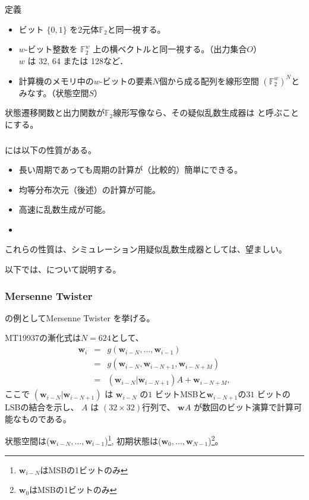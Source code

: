 \documentclass[cjk, dvips, xcolor=dvipsnames, hyperref={bookmarks=false}]{beamer}
\def\F2{{\mathbb F}_2}
\def\bw{{{\mathbf w}}}
\begin{document}
\begin{frame}[t]
  \frametitle{\insertsubsection}
  \begin{block}{定義}
    \begin{itemize}
    \item ビット $\{0,1\}$ を2元体$\F2$と同一視する。
    \item $w$-ビット整数を $\F2^{w}$ 上の横ベクトルと同一視する。（出力集合$O$）\\
      $w$ は 32, 64 または 128など．
    \item 計算機のメモリ中の$w$-ビットの要素$N$個から成る配列を線形空間
      $(\F2^{w})^N$とみなす。（状態空間$S$）
    \end{itemize}
  \end{block}

  \pause
  \vspace{\baselineskip}
  状態遷移関数と出力関数が$\F2$線形写像なら、その疑似乱数生成器は
  \strong{\FLPRNG}と呼ぶことにする。
\end{frame}

\begin{frame}[t]
  \frametitle{\insertsubsection}

  \FLPRNG には以下の性質がある。
  \begin{itemize}
  \item 長い周期であっても周期の計算が（比較的）簡単にできる。
  \pause
  \item 均等分布次元（後述）の計算が可能。
  \pause
  \item 高速に乱数生成が可能。
  \pause
  \item {}
  \end{itemize}

  \pause
  これらの性質は、シミュレーション用疑似乱数生成器としては、望ましい。

  以下では、\FLPRNG について説明する。
\end{frame}

\begin{frame}[t]
  \frametitle{Mersenne Twister}

  \FLPRNG の例としてMersenne Twister を挙げる。

  MT19937の漸化式は$N = 624$として、
  \begin{eqnarray*}
    \bw_i &=& g(\bw_{i-N},\ldots,\bw_{i-1}) \\
    &=& g(\bw_{i-N}, \bw_{i-N+1}, \bw_{i-N+M})\\
    &=& (\bw_{i-N}|\bw_{i-N+1})A + \bw_{i-N+M},
  \end{eqnarray*}
  ここで $(\bw_{i-N}|\bw_{i-N+1})$ は
  $\bw_{i-N}$ の$1$ ビットMSBと$\bw_{i-N+1}$の$31$ ビットのLSBの結合を示し、
  $A$ は $(32\times 32)$行列で、
  $\bw A$ が数回のビット演算で計算可能なものである。

  \pause
  \vspace{\baselineskip}
  状態空間は($\bw_{i-N},\ldots,\bw_{i-1}$)\footnote{$\bw_{i-N}$はMSBの1ビットのみ},
  初期状態は($\bw_{0},\ldots,\bw_{N-1}$)\footnote{$\bw_{0}$はMSBの1ビットのみ}。
\end{frame}
\end{document}
